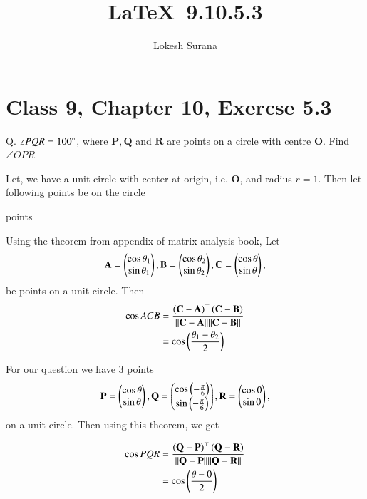\documentclass[journal,12pt,twocolumn]{IEEEtran}
\let\vec\mathbf
\begin{document}
\vspace{3cm}
\title{\LaTeX\ 9.10.5.3}
\author{Lokesh Surana}
\maketitle
\section*{Class 9, Chapter 10, Exercse 5.3}

Q. $\angle{PQR} = 100\degree$, where $\vec{P}, \vec{Q}$ and $\vec{R}$ are points on a circle with centre $\vec{O}$. Find $\angle{OPR}$

\solution
Let, we have a unit circle with center at origin, i.e. $\vec{O}$, and radius $r = 1$.
Then let following points be on the circle

\begin{table}[ht!]
    
    \caption{points}
    \label{tab:points}
\end{table}

Using the theorem from appendix of matrix analysis book,
Let 
\begin{align}
\vec{A} =  \myvec{\cos \theta_1 \\ \sin \theta_1},
\vec{B} =  \myvec{\cos \theta_2 \\ \sin \theta_2},
\vec{C} =  \myvec{\cos \theta \\ \sin \theta},
\end{align}
 be points on  a unit circle. Then
\begin{align}
  \cos ACB&= \frac{\brak{\vec{C}-\vec{A}}^{\top} \brak{\vec{C}-\vec{B}}}{\norm{\vec{C}-\vec{A}}\norm{\vec{C}-\vec{B}}}
  \\
  &= \cos \brak{\frac{\theta_1 - \theta_2}{2}}
\end{align}


For our question we have 3 points
\begin{align}
    \vec{P} =  \myvec{\cos \theta   \\ \sin \theta},
    \vec{Q} =  \myvec{\cos \brak{-\frac{\pi}{6}} \\ \sin \brak{-\frac{\pi}{6}}},
    \vec{R} =  \myvec{\cos 0 \\ \sin 0},
\end{align}
on a unit circle. Then using this theorem, we get

\begin{align}
    \label{eq:1} \cos PQR & = \frac{\brak{\vec{Q}-\vec{P}}^{\top} \brak{\vec{Q}-\vec{R}}}{\norm{\vec{Q}-\vec{P}}\norm{\vec{Q}-\vec{R}}}\\
    & = \cos \brak{\frac{\theta - 0}{2}}
\end{align}
\end{document}
